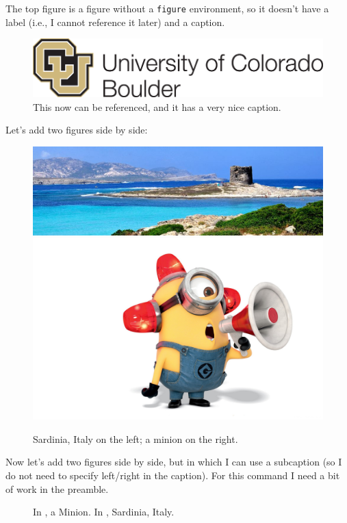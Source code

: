 \documentclass{article}
\begin{document}
\vspace{3em}

The top figure is a figure without a \texttt{figure} environment, so it doesn't have a label (i.e., I cannot reference it later) and a caption.


\begin{figure}[h!]
    \centering
    \includegraphics[width=0.49\linewidth]{Images/CUBoulderLogo.png}
    \caption{This now can be referenced, and it has a very nice caption.}
    \label{fig:CuLogo}
\end{figure}

Let's add two figures side by side:
\begin{figure}[h!]
    \centering
    \includegraphics[width=0.5\linewidth]{Images/Stintino.jpg}
    \hspace{2em} %
    \includegraphics[width=0.4\linewidth]{Images/Minion.jpg}
    \caption{Sardinia, Italy on the left; a minion on the right.}
    \label{fig:SardiniaAndMinion}
\end{figure}

Now let's add two figures side by side, but in which I can use a subcaption (so I do not need to specify left/right in the caption). For this command I need a bit of work in the preamble.

\begin{figure}
    \centering
    \hfill %
    \caption{In \protect{}, a Minion. In \protect{}, Sardinia, Italy.}
\end{figure}

\clearpage


\end{document}
